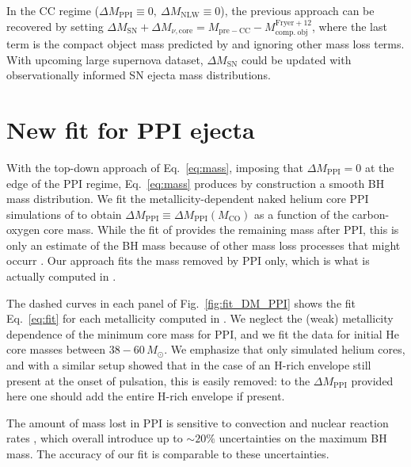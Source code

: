 \documentclass[twocolumn]{aastex63}
\DeclareRobustCommand{\Eqref}[1]{Eq.~\ref{#1}}
\DeclareRobustCommand{\Figref}[1]{Fig.~\ref{#1}}
\begin{document}
In the CC regime ($\Delta M_\mathrm{PPI}\equiv 0, \ \Delta M_\mathrm{NLW}\equiv0$), the previous approach can be recovered by
setting
$\Delta M_\mathrm{SN} + \Delta M_{\nu, \mathrm{core}} = M_\mathrm{pre-CC} - M_\mathrm{comp.\ obj}^\mathrm{Fryer+12}$,
where the last term is the compact object mass predicted by
\cite{fryer:12} and ignoring other mass loss terms. With upcoming
large supernova dataset, $\Delta M_\mathrm{SN}$ could be updated with
observationally informed SN ejecta mass distributions.

\section{New fit for PPI ejecta}

With the top-down approach of \Eqref{eq:mass}, imposing that
$\Delta M_\mathrm{PPI}=0$ at the edge of the PPI regime,
\Eqref{eq:mass} produces by construction a smooth BH mass
distribution. We fit the metallicity-dependent naked helium core PPI
simulations of \cite{farmer:19} to obtain
$\Delta M_\mathrm{PPI} \equiv \Delta M_\mathrm{PPI}(M_\mathrm{CO})$ as
a function of the carbon-oxygen core mass. While the fit of
\cite{farmer:19} provides the remaining mass after PPI, this is only
an estimate of the BH mass because of other mass loss processes that
might occurr \citep[e.g.,][]{renzo:20csm, powell:21}. Our approach
fits the mass removed by PPI only, which is what is actually computed
in \cite{farmer:19}.


The dashed curves in each panel of \Figref{fig:fit_DM_PPI} shows the
fit \Eqref{eq:fit} for each metallicity computed in
\cite{farmer:19}. We neglect the (weak) metallicity dependence of the
minimum core mass for PPI, and we fit the data for initial He core
masses between $38-60\,M_\odot$.  We emphasize that \cite{farmer:19}
only simulated helium cores, and with a similar setup
\cite{renzo:20csm} showed that in the case of an H-rich envelope still
present at the onset of pulsation, this is easily removed: to the
$\Delta M_\mathrm{PPI}$ provided here one should add the entire H-rich
envelope if present.

The amount of mass lost in PPI is sensitive to convection
\cite{renzo:20conv} and nuclear reaction rates \cite{farmer:19,
  farmer:20, costa:21, woosley:21, mehta:21}, which overall introduce
up to $\sim{}20\%$ uncertainties on the maximum BH mass. The accuracy
of our fit is comparable to these uncertainties.
\end{document}
